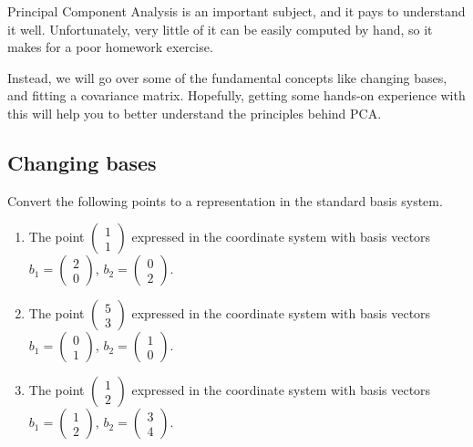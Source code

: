 \documentclass[11pt]{article}
\begin{document}
Principal Component Analysis is an important subject, and it pays to understand it well. Unfortunately, very little of it can be easily computed by hand, so it makes for a poor homework exercise. 

Instead, we will go over some of the fundamental concepts like changing bases, and fitting a covariance matrix. Hopefully, getting some hands-on experience with this will help you to better understand the principles behind PCA.

\subsection{Changing bases}

Convert the following points to a representation in the standard basis system.

\begin{enumerate}
	\item The point $\begin{pmatrix}1 \\1\end{pmatrix}$ expressed in the coordinate system with basis vectors $b_1 = \begin{pmatrix}2 \\0\end{pmatrix}$, $b_2 = \begin{pmatrix}0 \\2\end{pmatrix}$. 
	\item The point $\begin{pmatrix}5 \\3 \end{pmatrix}$ expressed in the coordinate system with basis vectors $b_1 = \begin{pmatrix}0 \\1\end{pmatrix}$, $b_2 = \begin{pmatrix}1 \\0\end{pmatrix}$. 
	\item The point $\begin{pmatrix}1 \\2 \end{pmatrix}$ expressed in the coordinate system with basis vectors $b_1 = \begin{pmatrix}1 \\2\end{pmatrix}$, $b_2 = \begin{pmatrix}3 \\4\end{pmatrix}$. 
\end{enumerate}
\end{document}

